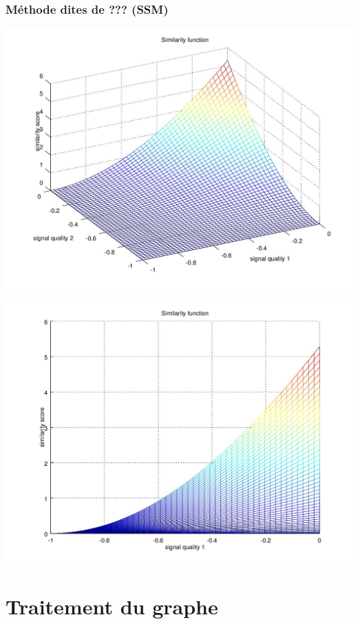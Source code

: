\documentclass[11pt,a4paper]{article}
\begin{document}
  \subsubsection{Méthode dites de ??? (SSM)}
    \begin{center}
      \includegraphics[scale=0.5]{similarity-function.jpg}
    \end{center}
    \begin{center}
      \includegraphics[scale=0.5]{similarity-function-profil.jpg}
    \end{center}
    

\section{Traitement du graphe}
\end{document}
